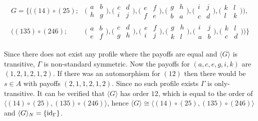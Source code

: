 \begin{example}
\begin{align*}
G = \{ \bigl((14) \circ (25); &\bigl(\begin{smallmatrix} a & b \\ h & g \end{smallmatrix}\bigr), \bigl(\begin{smallmatrix} c & d \\ i & j \end{smallmatrix}\bigr), \bigl(\begin{smallmatrix} e & f \\ f & e \end{smallmatrix}\bigr), \bigl(\begin{smallmatrix} g & h \\ b & a \end{smallmatrix}\bigr), \bigl(\begin{smallmatrix} i & j \\ c & d \end{smallmatrix}\bigr), \bigl(\begin{smallmatrix} k & l \\ l & k \end{smallmatrix}\bigr)\bigr),\\
               \bigl((135) \circ (246); &\bigl(\begin{smallmatrix} a & b \\ e & f \end{smallmatrix}\bigr), \bigl(\begin{smallmatrix} c & d \\ g & h \end{smallmatrix}\bigr), \bigl(\begin{smallmatrix} e & f \\ i & j \end{smallmatrix}\bigr), \bigl(\begin{smallmatrix} g & h \\ k & l \end{smallmatrix}\bigr), \bigl(\begin{smallmatrix} i & j \\ a & b \end{smallmatrix}\bigr), \bigl(\begin{smallmatrix} k & l \\ c & d \end{smallmatrix}\bigr)\bigr)\}
\end{align*}

Since there does not exist any profile where the payoffs are equal and $\langle{G}\rangle$ is transitive, $\Gamma$ is non-standard symmetric. Now the payoffs for $(a,c,e,g,i,k)$ are $(1, 2, 1, 2, 1, 2)$. If there was an automorphism for $(12)$ then there would be $s \in A$ with payoffs $(2, 1, 1, 2, 1, 2)$. Since no such profile exists $\Gamma$ is only-transitive. It can be verified that $\langle{G}\rangle$ has order $12$, which is equal to the order of $\langle (14) \circ (25), (135) \circ (246)\rangle$, hence $\langle{G}\rangle \cong \langle (14) \circ (25), (135) \circ (246)\rangle$ and $\langle{G}\rangle_N = \{\text{id}_{\Gamma}\}$.
\end{example}

